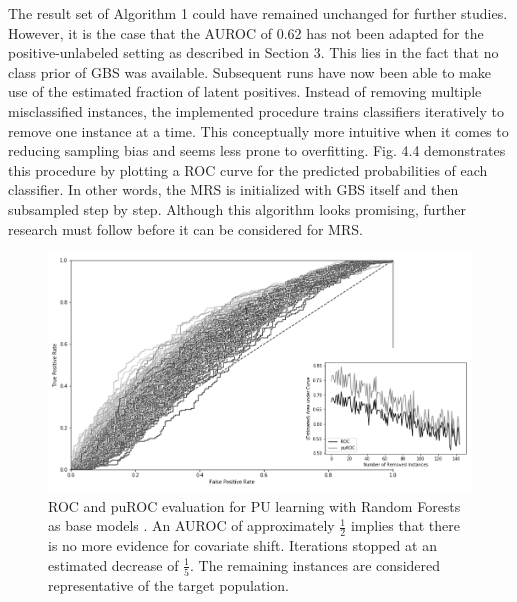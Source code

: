 The result set of Algorithm 1 could have remained unchanged for further studies. However, it is the case that the AUROC of 0.62 has not been adapted for the positive-unlabeled setting as described in Section 3. This lies in the fact that no class prior of GBS was available. Subsequent runs have now been able to make use of the estimated fraction of latent positives. Instead of removing multiple misclassified instances, the implemented procedure trains classifiers iteratively to remove one instance at a time. This conceptually more intuitive when it comes to reducing sampling bias and seems less prone to overfitting. Fig. 4.4 demonstrates this procedure by plotting a ROC curve for the predicted probabilities of each classifier. In other words, the MRS is initialized with GBS itself and then subsampled step by step. Although this algorithm looks promising, further research must follow before it can be considered for MRS. 

\begin{figure}[ht]
\centering
   \includegraphics[scale=0.46,angle=0]{fig/res}
\captionsetup{width= 380pt}
\caption{ROC and puROC evaluation for PU learning with Random Forests as base models \cite{breiman2}. An AUROC of approximately \(\frac{1}{2}\) implies that there is no more evidence for covariate shift. Iterations stopped at an estimated decrease of \(\frac{1}{5}\). The remaining instances are considered representative of the target population.}
   \label{fig:Ng1} 
\end{figure}
